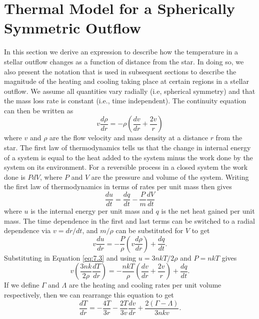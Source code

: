 \section{Thermal Model for a Spherically Symmetric Outflow}\label{sec:7.2}
In this section we derive an expression to describe how the temperature in a stellar outflow changes as a function of distance from the star. In doing so, we also present the notation that is used in subsequent sections to describe the magnitude of the heating and cooling taking place at certain regions in a stellar outflow. We assume all quantities vary radially (i.e, spherical symmetry) and that the mass loss rate is constant (i.e., time independent). The continuity equation can then be written as
\begin{equation}
\label{eq:7.3}
v\frac{d\rho}{dr}=-\rho \left(\frac{dv}{dr}+\frac{2v}{r} \right)
\end{equation}
where $v$ and $\rho$ are the flow velocity and mass density at a distance $r$ from the star. The first law of thermodynamics tells us that the change in internal energy of a system is equal to the heat added to the system minus the work done by the system on its environment. For a reversible process in a closed system the work done is $PdV$, where $P$ and $V$ are the pressure and volume of the system. Writing the first law of thermodynamics in terms of rates per unit mass then gives
\begin{equation}
\frac{du}{dt}=\frac{dq}{dt}-\frac{P}{m}\frac{dV}{dt}
\end{equation}
where $u$ is the internal energy per unit mass and $q$ is the net heat gained per unit mass. The time dependence in the first and last terms can be switched to a radial dependence via $v=dr/dt$, and $m/\rho$ can be substituted for $V$ to get
\begin{equation}
v\frac{du}{dr}=-\frac{P}{\rho}\left(v\frac{d\rho}{dr} \right)+\frac{dq}{dt}.
\end{equation}
Substituting in Equation \ref{eq:7.3} and using $u=3nkT/2\rho$ and $P=nkT$ gives
\begin{equation}
v\left(\frac{3nk}{2\rho}\frac{dT}{dr}\right)=-\frac{nkT}{\rho}\left(\frac{dv}{dr} + \frac{2v}{r}\right) +\frac{dq}{dt}.
\end{equation}
If we define $\Gamma$ and $\Lambda$ are the heating and cooling rates per unit volume respectively, then we can rearrange this equation to get
\begin{equation}
\frac{dT}{dr}=-\frac{4T}{3r}-\frac{2T}{3v}\frac{dv}{dr}+\frac{2(\Gamma-\Lambda)}{3nkv}.
\end{equation}
